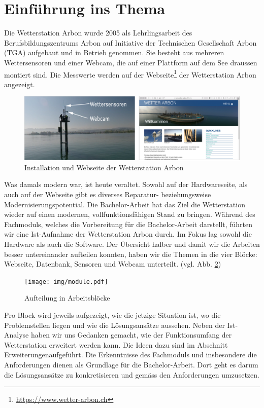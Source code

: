 \section*{Einführung ins Thema}

Die Wetterstation Arbon wurde 2005 als Lehrlingsarbeit des Berufsbildungszentrums Arbon auf Initiative der Technischen Gesellschaft Arbon (TGA) aufgebaut und in Betrieb genommen. Sie besteht aus mehreren Wettersensoren und einer Webcam, die auf einer Plattform auf dem See draussen montiert sind. Die Messwerte werden auf der Webseite\footnote{ \url{https://www.wetter-arbon.ch}}  der Wetterstation Arbon angezeigt.

\begin{figure}[h!]
	\centering
	\includegraphics[width=1\linewidth]{img/kombi}
	\caption{Installation und Webseite der Wetterstation Arbon}
	\label{img:wetterstation}
\end{figure}

Was damals modern war, ist heute veraltet. Sowohl auf der Hardwareseite, als auch auf der Webseite gibt es diverses Reparatur- beziehungsweise Modernisierungspotential. Die Bachelor-Arbeit hat das Ziel die Wetterstation wieder auf einen modernen, vollfunktionsfähigen Stand zu bringen. Während des Fachmoduls, welches die Vorbereitung für die Bachelor-Arbeit darstellt, führten wir eine Ist-Aufnahme der Wetterstation Arbon durch. Im Fokus lag sowohl die Hardware als auch die Software. Der Übersicht halber und damit wir die Arbeiten besser untereinander aufteilen konnten, haben wir die Themen in die vier Blöcke:  Webseite, Datenbank, Sensoren und Webcam unterteilt. (vgl. Abb. \ref{img:module})

\vspace{5mm} %

\begin{figure}[h!]
	\centering
	\texttt{[image: img/module.pdf]}
	\caption{Aufteilung in Arbeitsblöcke}
	\label{img:module}
\end{figure}

Pro Block wird jeweils aufgezeigt, wie die jetzige Situation ist, wo die Problemstellen liegen und wie die Lösungsansätze aussehen. Neben der Ist-Analyse haben wir uns Gedanken gemacht, wie der Funktionsumfang der Wetterstation erweitert werden kann. Die Ideen dazu sind im Abschnitt \flqq Erweiterungen\frqq aufgeführt. Die Erkenntnisse des Fachmoduls und insbesondere die Anforderungen dienen als Grundlage für die Bachelor-Arbeit. Dort geht es darum die Lösungsansätze zu konkretisieren und gemäss den Anforderungen umzusetzen.

\newpage
